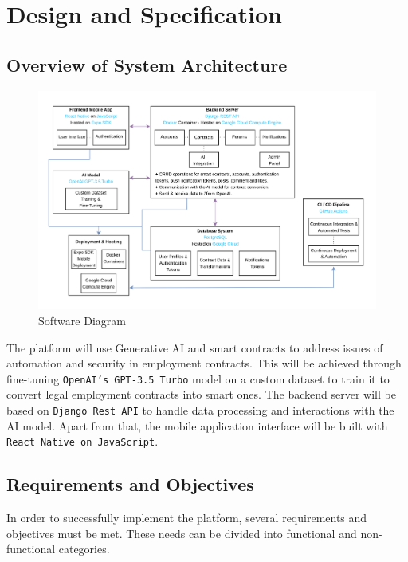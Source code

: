 \chapter{Design and Specification}

\section{Overview of System Architecture}

\begin{figure}[!ht]
    \centering
    \includegraphics[width=1\linewidth]{LATEX/Appendices/Images/Software/software-diagram.png}
    \caption{Software Diagram}
    \label{fig:software-diagram}
\end{figure}

The platform will use Generative AI and smart contracts to address issues of automation and security in employment contracts. This will be achieved through fine-tuning \texttt{OpenAI's GPT-3.5 Turbo} model on a custom dataset to train it to convert legal employment contracts into smart ones. The backend server will be based on \texttt{Django Rest API} to handle data processing and interactions with the AI model. Apart from that, the mobile application interface will be built with \texttt{React Native on JavaScript}.

\section{Requirements and Objectives}

In order to successfully implement the platform, several requirements and objectives must be met. These needs can be divided into functional and non-functional categories.

